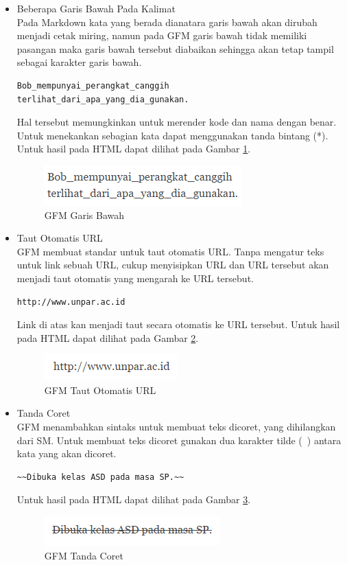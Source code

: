 \begin{itemize}
\item Beberapa Garis Bawah Pada Kalimat\\
Pada Markdown kata yang berada dianatara garis bawah akan dirubah menjadi cetak miring, namun pada GFM garis bawah tidak memiliki pasangan maka garis bawah tersebut diabaikan sehingga akan tetap tampil sebagai karakter garis bawah.
\begin{lstlisting}[basicstyle=\footnotesize]
Bob_mempunyai_perangkat_canggih
terlihat_dari_apa_yang_dia_gunakan.
\end{lstlisting}
Hal tersebut memungkinkan untuk merender kode dan nama dengan benar. Untuk menekankan sebagian kata dapat menggunakan tanda bintang (*). Untuk hasil pada HTML dapat dilihat pada Gambar \ref{fig:gb}.
\begin{figure}[H]
\centering
\includegraphics[scale=1]{Gambar/garisbawah.png}
\caption[GFM Garis Bawah]{GFM Garis Bawah}
\label{fig:gb}
\end{figure}

\item Taut Otomatis URL\\
GFM membuat standar untuk taut otomatis URL. Tanpa mengatur teks untuk link sebuah URL, cukup menyisipkan URL dan URL tersebut akan menjadi taut otomatis yang mengarah ke URL tersebut.
\begin{lstlisting}[basicstyle=\footnotesize]
http://www.unpar.ac.id
\end{lstlisting}
Link di atas kan menjadi taut secara otomatis ke URL tersebut. Untuk hasil pada HTML dapat dilihat pada Gambar \ref{fig:gfml}.
\begin{figure}[H]
\centering
\includegraphics[scale=1]{Gambar/gfml.png}
\caption[GFM Taut Otomatis URL]{GFM Taut Otomatis URL}
\label{fig:gfml}
\end{figure}

\item Tanda Coret\\
GFM menambahkan sintaks untuk membuat teks dicoret, yang dihilangkan dari SM. Untuk membuat teks dicoret gunakan dua karakter tilde (~) antara kata yang akan dicoret.
\begin{lstlisting}[basicstyle=\footnotesize]
~~Dibuka kelas ASD pada masa SP.~~
\end{lstlisting}
Untuk hasil pada HTML dapat dilihat pada Gambar \ref{fig:tc}.
\begin{figure}[H]
\centering
\includegraphics[scale=1]{Gambar/tc.png}
\caption[GFM Tanda Coret]{GFM Tanda Coret}
\label{fig:tc}
\end{figure}


\end{itemize}
